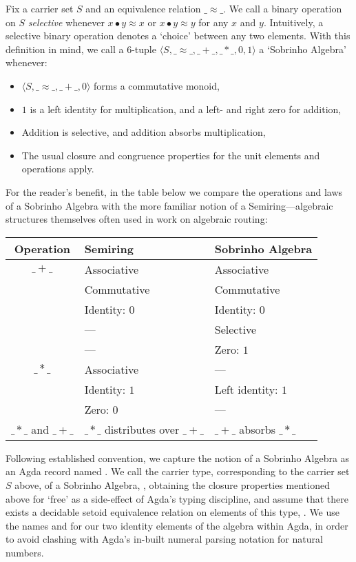 Fix a carrier set $S$ and an equivalence relation $\_{≈}\_$.
We call a binary operation on $S$ \emph{selective} whenever $x \bullet y ≈ x$ or $x \bullet y ≈ y$ for any $x$ and $y$.
Intuitively, a selective binary operation denotes a `choice' between any two elements.
With this definition in mind, we call a 6-tuple $\langle S, \_{≈}\_, \_{+}\_, \_{*}\_, 0, 1 \rangle$ a `Sobrinho Algebra' whenever:
\begin{itemize}
\item
$\langle S, \_{≈}\_, \_{+}\_, 0 \rangle$ forms a commutative monoid,
\item
$1$ is a left identity for multiplication, and a left- and right zero for addition,
\item
Addition is selective, and addition absorbs multiplication,
\item
The usual closure and congruence properties for the unit elements and operations apply.
\end{itemize}

For the reader's benefit, in the table below we compare the operations and laws of a Sobrinho Algebra with the more familiar notion of a Semiring---algebraic structures themselves often used in work on algebraic routing:

\begin{center}
  \begin{tabular}{c||l@{\;\;\;}|l}
  \textbf{Operation} & \textbf{Semiring} & \textbf{Sobrinho Algebra} \\
  \midrule
$\_{+}\_$ & Associative & Associative \\
                   & Commutative & Commutative \\
                   & Identity: $0$ & Identity: $0$ \\
                   & ---                      & Selective \\
                   & ---                      & Zero: $1$ \\
  \midrule
  $\_{*}\_$ & Associative & --- \\
                   & Identity: $1$ & Left identity: $1$ \\
                   & Zero: $0$     & --- \\
  \midrule
  $\_{*}\_$ and $\_{+}\_$ & $\_{*}\_$ distributes over $\_{+}\_$ &
                     $\_{+}\_$ absorbs $\_{*}\_$ \\
  \midrule
  \end{tabular}
\end{center}

Following established convention, we capture the notion of a Sobrinho Algebra as an Agda record named .
We call the carrier type, corresponding to the carrier set $S$ above, of a Sobrinho Algebra, , obtaining the closure properties mentioned above for `free' as a side-effect of Agda's typing discipline, and assume that there exists a decidable setoid equivalence relation on elements of this type, .
We use the names  and  for our two identity elements of the algebra within Agda, in order to avoid clashing with Agda's in-built numeral parsing notation for natural numbers.

